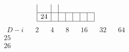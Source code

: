 \documentclass{article}
\begin{document}
{$$\begin{array}{|r|*{6}{r|}}
 & 
\\
\hline
24 
 & 
 & 
 & 
 & 
 & 
 & 
\\
\hline
\end{array}
$$
$$
\begin{array}{|r|*{6}{r|}}
\hline
\ \ D-i \ \ &\ \ 2\ \ &\ \ 4\ \ &\ \ 8\ \ &\ \ 16\ \ &\ \ 32\ \ &\ \ 64\ \ \\
\hline
25 
 & 
 & 
 & 
 & 
 & 
 & 
\\
\hline
26 
 & 

\end{array}$$}
\end{document}
